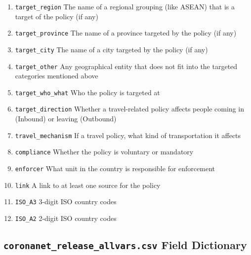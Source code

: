 \documentclass[
]{article}
\begin{document}
\begin{enumerate}
\item
  \texttt{target\_region} The name of a regional grouping (like ASEAN) that is a target of the policy (if any)
\item
  \texttt{target\_province} The name of a province targeted by the policy (if any)
\item
  \texttt{target\_city} The name of a city targeted by the policy (if any)
\item
  \texttt{target\_other} Any geographical entity that does not fit into the targeted categories mentioned above
\item
  \texttt{target\_who\_what} Who the policy is targeted at
\item
  \texttt{target\_direction} Whether a travel-related policy affects people coming in (Inbound) or leaving (Outbound)
\item
  \texttt{travel\_mechanism} If a travel policy, what kind of transportation it affects
\item
  \texttt{compliance} Whether the policy is voluntary or mandatory
\item
  \texttt{enforcer} What unit in the country is responsible for enforcement
\item
  \texttt{link} A link to at least one source for the policy
\item
  \texttt{ISO\_A3} 3-digit ISO country codes
\item
  \texttt{ISO\_A2} 2-digit ISO country codes
\end{enumerate}

\hypertarget{coronanet_release_allvars.csv-field-dictionary}{%
\subsection*{\texorpdfstring{\texttt{coronanet\_release\_allvars.csv} Field Dictionary}{coronanet\_release\_allvars.csv Field Dictionary}}\label{coronanet_release_allvars.csv-field-dictionary}}
\end{document}
